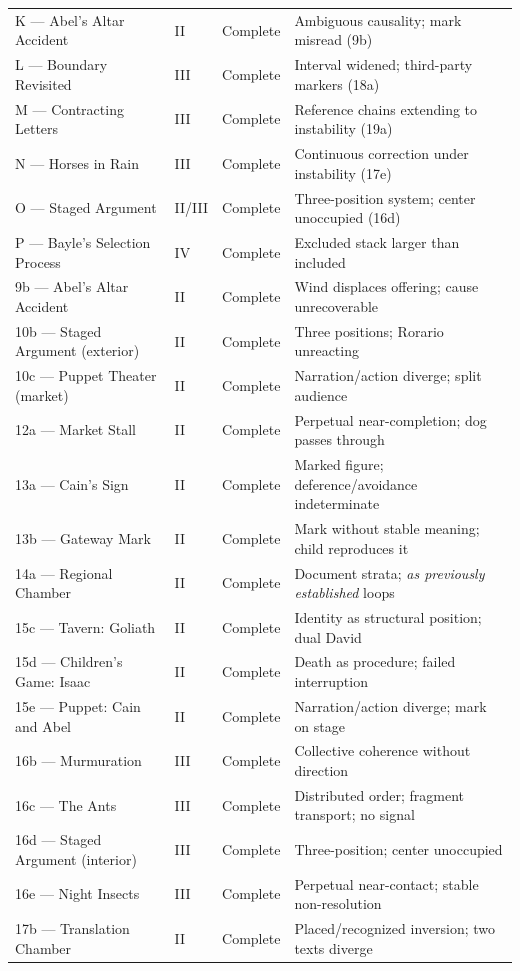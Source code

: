 \documentclass[12pt, oneside]{amsart}
\begin{document}
\begin{longtable}{p{3.2cm}p{1.5cm}p{1.5cm}p{5.8cm}}
K — Abel's Altar Accident & II & Complete & Ambiguous causality; mark misread (9b) \\
L — Boundary Revisited & III & Complete & Interval widened; third-party markers (18a) \\
M — Contracting Letters & III & Complete & Reference chains extending to instability (19a) \\
N — Horses in Rain & III & Complete & Continuous correction under instability (17e) \\
O — Staged Argument & II/III & Complete & Three-position system; center unoccupied (16d) \\
P — Bayle's Selection Process & IV & Complete & Excluded stack larger than included \\
9b — Abel's Altar Accident & II & Complete & Wind displaces offering; cause unrecoverable \\
10b — Staged Argument (exterior) & II & Complete & Three positions; Rorario unreacting \\
10c — Puppet Theater (market) & II & Complete & Narration/action diverge; split audience \\
12a — Market Stall & II & Complete & Perpetual near-completion; dog passes through \\
13a — Cain's Sign & II & Complete & Marked figure; deference/avoidance indeterminate \\
13b — Gateway Mark & II & Complete & Mark without stable meaning; child reproduces it \\
14a — Regional Chamber & II & Complete & Document strata; \textit{as previously established} loops \\
15c — Tavern: Goliath & II & Complete & Identity as structural position; dual David \\
15d — Children's Game: Isaac & II & Complete & Death as procedure; failed interruption \\
15e — Puppet: Cain and Abel & II & Complete & Narration/action diverge; mark on stage \\
16b — Murmuration & III & Complete & Collective coherence without direction \\
16c — The Ants & III & Complete & Distributed order; fragment transport; no signal \\
16d — Staged Argument (interior) & III & Complete & Three-position; center unoccupied \\
16e — Night Insects & III & Complete & Perpetual near-contact; stable non-resolution \\
17b — Translation Chamber & II & Complete & Placed/recognized inversion; two texts diverge \\

\end{longtable}
\end{document}
